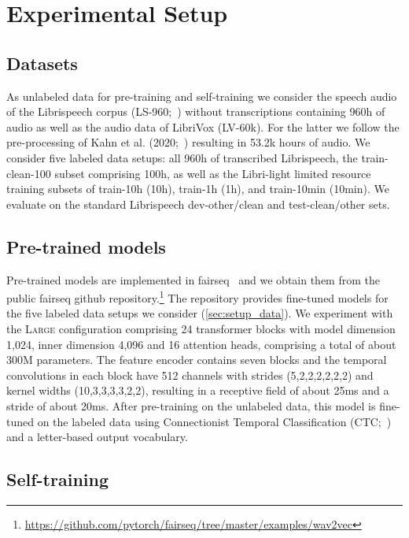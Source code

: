 \documentclass{article}
\newcommand{\wvppbig}{\textsc{Large}}
\newcommand{\vox}{LibriVox}
\newcommand{\libri}{Librispeech}
\newcommand{\libril}{Libri-light}
\newcommand{\voxsz}{LV-60k}
\newcommand{\librisz}{LS-960}
\begin{document}
\section{Experimental Setup}
\label{sec:foot}

\subsection{Datasets}
 \label{sec:setup_data}

As unlabeled data for pre-training and self-training we consider the speech audio of the \libri{} corpus (\librisz{};~\cite{panayotov2015librispeech}) without transcriptions containing 960h of audio as well as the audio data of \vox{} (\voxsz{}). 
For the latter we follow the pre-processing of Kahn et al. (2020;~\cite{kahn2020librilight}) resulting in 53.2k hours of audio.
We consider five labeled data setups: 
all 960h of transcribed \libri{}, the train-clean-100 subset comprising 100h, as well as the \libril{} limited resource training subsets of train-10h (10h), train-1h (1h), and train-10min (10min).
We evaluate on the standard \libri{} dev-other/clean and test-clean/other sets.


\subsection{Pre-trained models}

Pre-trained models are implemented in fairseq~\cite{ott2019fairseq} and we obtain them from the public fairseq github repository.\footnote{\url{https://github.com/pytorch/fairseq/tree/master/examples/wav2vec}}
The repository provides fine-tuned models for the five labeled data setups we consider (\autoref{sec:setup_data}).
We experiment with the \wvppbig{} configuration comprising 24 transformer blocks with model dimension 1,024, inner dimension 4,096 and 16 attention heads, comprising a total of about 300M parameters.
The feature encoder contains seven blocks and the temporal convolutions in each block have 512 channels with strides (5,2,2,2,2,2,2) and kernel widths (10,3,3,3,3,2,2), resulting in a receptive field of about 25ms and a stride of about 20ms.
After pre-training on the unlabeled data, this model is fine-tuned on the labeled data using Connectionist Temporal Classification (CTC;~\cite{graves2006connectionist}) and a letter-based output vocabulary.





\subsection{Self-training}
\label{sec:self-training}
\end{document}
